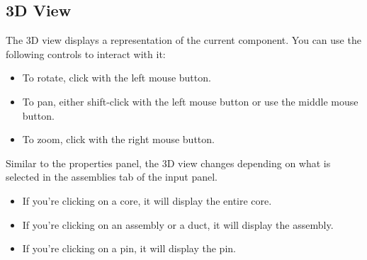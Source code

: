 \subsection{3D View}
The 3D view displays a representation of the current component.  You can use the following controls to interact with it:

\begin{itemize}
	\item{To rotate, click with the left mouse button.}
	\item{To pan, either shift-click with the left mouse button or use the middle mouse button.}
	\item{To zoom, click with the right mouse button.}
\end{itemize}

Similar to the properties panel, the 3D view changes depending on what is selected in the assemblies tab of the input panel.

\begin{itemize}
	\item{If you're clicking on a core, it will display the entire core.}
	\item{If you're clicking on an assembly or a duct, it will display the assembly.}
	\item{If you're clicking on a pin, it will display the pin.}
\end{itemize}





